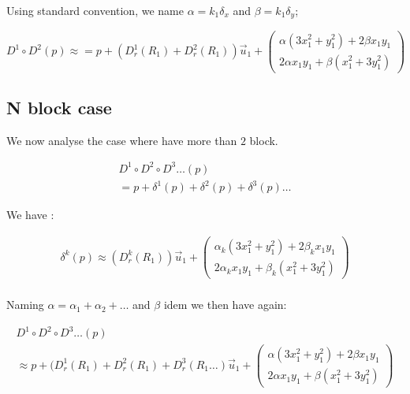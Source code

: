 Using standard convention, we name $\alpha = k_1  \delta_x $ and $\beta = k_1  \delta_y$;

\begin{equation}
	D^1 \circ D^2 (p) 
	\approx
	= p +    (D^1_r(R_1) + D^2_r(R_1))  \vec{u}_1  
	  +\begin{pmatrix} \alpha(3 x_1^2 + y_1^2 ) +2\beta x_1 y_1   \\ 2  \alpha x_1 y_1 +  \beta( x_1^2 + 3 y_1^2)  \end{pmatrix}
\end{equation}


\subsection{N block case}

We now analyse the case where have more than $2$ block.  


\begin{equation}
\begin{multlined}
	D^1 \circ D^2 \circ D^3 \dots (p)  \\
	= p +\delta^1(p) +\delta^2(p) + \delta^3(p) \dots 
\end{multlined}
\end{equation}

We have :

\begin{equation}
\begin{multlined}
        \delta^k(p)  
	\approx  (D^k_r(R_1))  \vec{u}_1  
          +\begin{pmatrix} \alpha_k(3 x_1^2 + y_1^2 ) +2\beta_k x_1 y_1   \\ 2  \alpha_k x_1 y_1 +  \beta_k( x_1^2 + 3 y_1^2)  \end{pmatrix} \\
\end{multlined}
\end{equation}

Naming $\alpha =  \alpha_1+\alpha_2 + \dots$ and $\beta$ idem we then have again:


\begin{equation}
\begin{multlined}
	D^1 \circ D^2 \circ D^3 \dots (p)  \\
	\approx  p + (D^1_r(R_1) + D^2_r(R_1) +  D^3_r(R_1 \dots )  \vec{u}_1
	  +\begin{pmatrix} \alpha(3 x_1^2 + y_1^2 ) +2\beta x_1 y_1   \\ 2  \alpha x_1 y_1 +  \beta( x_1^2 + 3 y_1^2)  \end{pmatrix}
\end{multlined}
\end{equation}

